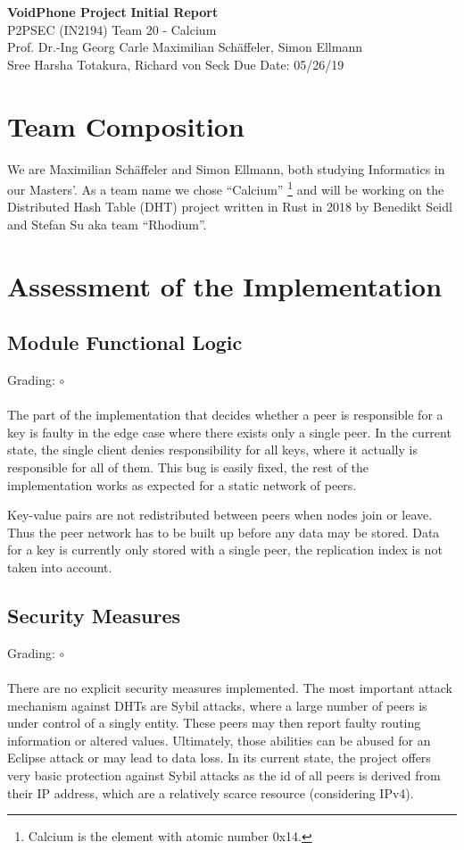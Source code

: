 \documentclass[a4paper, 11pt]{article}
\begin{document}
\noindent
\large\textbf{VoidPhone Project} \hfill \textbf{Initial Report} \\
\normalsize P2PSEC (IN2194)  \hfill Team 20 - Calcium\\
Prof. Dr.-Ing Georg Carle \hfill Maximilian Schäffeler, Simon Ellmann \\
Sree Harsha Totakura, Richard von Seck \hfill Due Date: 05/26/19


\section*{Team Composition}
We are Maximilian Schäffeler and Simon Ellmann, both studying Informatics in our Masters'.
As a team name we chose ``Calcium'' \footnote{Calcium is the element with atomic number 0x14.} and will be working on the Distributed Hash Table (DHT) project written in Rust \cite{Rust} in 2018 by Benedikt Seidl and Stefan Su aka team ``Rhodium''.


\section*{Assessment of the Implementation}
\subsection*{Module Functional Logic}
Grading: $\circ$\\
\\
The part of the implementation that decides whether a peer is responsible for a key is faulty in the edge case where there exists only a single peer.
In the current state, the single client denies responsibility for all keys, where it actually is responsible for all of them.
This bug is easily fixed, the rest of the implementation works as expected for a static network of peers.

Key-value pairs are not redistributed between peers when nodes join or leave. Thus the peer network has to be built up before any data may be stored.
Data for a key is currently only stored with a single peer, the replication index is not taken into account.

\subsection*{Security Measures}
Grading: $\circ$\\
\\
There are no explicit security measures implemented.
The most important attack mechanism against DHTs are Sybil attacks, where a large number of peers is under control of a singly entity. 
These peers may then report faulty routing information or altered values. 
Ultimately, those abilities can be abused for an Eclipse attack or may lead to data loss.
In its current state, the project offers very basic protection against Sybil attacks as the id of all peers is derived from their IP address, which are a relatively scarce resource (considering IPv4).
\end{document}
